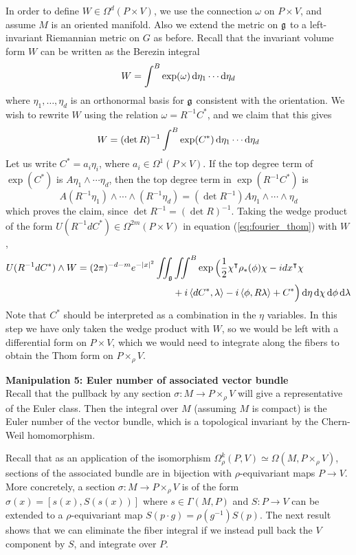 In order to define $W\in \Omega^d(P\times V)$, we use the connection $\omega$ 
on $P\times V$, and assume $M$ is an oriented manifold. Also we
extend the metric on  $\operatorname{\mathfrak{g}}$ to a left-invariant Riemannian metric on $G$ as before.
Recall that the invariant volume form $W$ can be written as the Berezin integral
\[
W = \int^B \exp(\omega) \odif{\eta_1}\cdots \odif{\eta_d}
\] 
where $\eta_1,\ldots,\eta_d$ is an orthonormal basis for $\operatorname{\mathfrak{g}}$ consistent with
the orientation. We wish to rewrite $W$ using the relation $\omega = R^{-1}C^*$,
and we claim that this gives 
\[
W = (\det R)^{-1}\int^B \exp(C^*) \odif{\eta_1}\cdots \odif{\eta_d}
\] 
Let us write $C^* = a_i\eta_i$, where  $a_i \in \Omega^1(P\times V)$. 
If the top degree term of $\exp(C^*)$ is  $A \eta_1\wedge\cdots\eta_d$, then
the top degree term in $\exp(R^{-1}C^*)$ is 
\[
A (R^{-1}\eta_1)\wedge\cdots\wedge(R^{-1}\eta_d)
=(\det R^{-1}) A \eta_1\wedge\cdots\wedge\eta_d
\] 
which proves the claim, since $\det R^{-1} = (\det R)^{-1}$.
Taking the wedge product of the form 
$U(R^{-1}dC^*) \in \Omega^{2m}(P\times V)$ in equation 
(\ref{eq:fourier_thom}) with $W$,
\begin{align} \label{eq:AJ_formula_thom}
U(R^{-1}dC^*)\wedge W	
= (2\pi)^{-d-m}e^{-\abs{x}^2}\iint_{\g}&\iint^B 
	\exp\Big(\frac{1}{2}\chi^{\intercal}\rho_*(\phi)\chi - idx^\intercal \chi\\
	&+i\gen{dC^*,\lambda}-i\gen{\phi,R\lambda} + C^*\Big)  \odif{\eta}
	\odif{\chi} \odif{\phi}\odif{\lambda}  \nonumber 
\end{align}
Note that $C^*$ should be interpreted as a combination in the $\eta$ variables. 
In this step we have only taken the wedge product with $W$, so we would be left 
with a differential form on  $P\times V$, which we would need to integrate along 
the fibers to obtain the Thom form on $P\times_\rho V$. 

\vspace{1ex}\noindent
\textbf{Manipulation 5: Euler number of associated vector bundle} \\
Recall that the pullback by any section $\sigma:M\to P\times_\rho V$ will give a
representative of the Euler class. 
Then the integral over $M$ (assuming $M$ is compact) is the Euler number of the 
vector bundle, which is a topological invariant by the Chern-Weil homomorphism. 

Recall that as an application of the isomorphism $\Omega_\rho^k(P,V)\simeq
\Omega(M,P\times_\rho V)$, sections of the associated bundle are in bijection
with $\rho$-equivariant maps  $P\to V$. More concretely, a section $\sigma :
M\to P\times_\rho V$ is of the form $\sigma(x) = 
[s(x),S(s(x))]$ where $s\in\Gamma(M,P)$ and  $S:P \to V$ can be extended
to a $\rho$-equivariant map $S(p\cdot g)=\rho(g^{-1})S(p)$. The next result
shows that 
we can eliminate the fiber integral if we instead pull back the $V$ component
by $S$, and integrate over $P$. 

